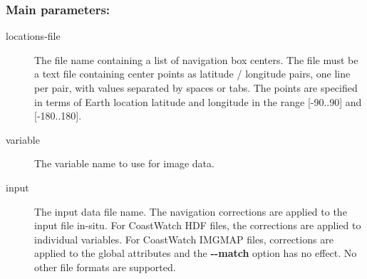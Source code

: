 \subsubsection*{Main parameters:}
\begin{description}
\item[ locations-file ] The file name containing a list of navigation box centers. The file must be a text file containing center points as latitude / longitude pairs, one line per pair, with values separated by spaces or tabs. The points are specified in terms of Earth location latitude and longitude in the range [-90..90] and [-180..180]. 
\item[ variable ] The variable name to use for image data. 
\item[ input ] The input data file name. The navigation corrections are applied to the input file in-situ. For CoastWatch HDF files, the corrections are applied to individual variables. For CoastWatch IMGMAP files, corrections are applied to the global attributes and the \textbf{-{-}match}
 option has no effect. No other file formats are supported.

\end{description}
